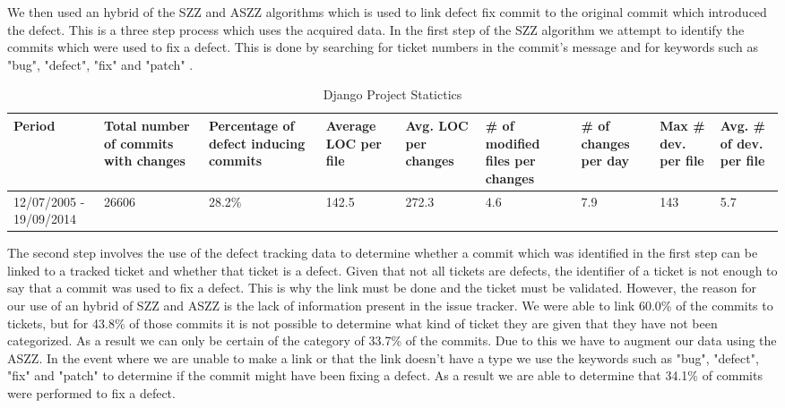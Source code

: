 \documentclass[10pt, conference]{IEEEtran}
\begin{document}
We then used an hybrid of the SZZ and ASZZ algorithms\cite{Sliwerski2005MSR} which is used to link defect fix commit to the original commit which introduced the defect. This is a three step process which uses the acquired data. In the first step of the SZZ algorithm we attempt to identify the commits which were used to fix a defect. This is done by searching for ticket numbers in the commit's message and for keywords such as "bug", "defect", "fix" and "patch" \cite{Kamei2013TSE}. 

\begin{table*}[t]
	\caption{Django Project Statictics}
	\begin{tabular}{|p{2 cm}|p{1.5 cm}|p{1.5 cm}|p{1.5 cm}|p{1.5 cm}|p{1.5 cm}|p{1.5 cm}|p{1.5 cm}|p{1.5 cm}|}
		\hline 
		Period  & Total number of commits with changes  & Percentage of defect inducing commits  & Average LOC per file  & Avg. LOC per changes  & \# of modified files per changes  & \# of changes per day  & Max \# dev. per file  & Avg. \# of dev. per file \tabularnewline
		\hline 
		12/07/2005 - 19/09/2014  & 26606  & 28.2\% & 142.5 & 272.3 & 4.6 & 7.9 & 143 & 5.7 \\ \hline 
	\end{tabular}
	\label{table:statistics}	
\end{table*}

The second step involves the use of the defect tracking data to determine whether a commit which was identified in the first step can be linked to a tracked ticket and whether that ticket is a defect. Given that not all tickets are defects, the identifier of a ticket is not enough to say that a commit was used to fix a defect. This is why the link must be done and the ticket must be validated. However, the reason for our use of an hybrid of SZZ and ASZZ is the lack of information present in the issue tracker. We were able to link 60.0\% of the commits to tickets, but for 43.8\% of those commits it is not possible to determine what kind of ticket they are given that they have not been categorized. As a result we can only be certain of the category of 33.7\% of the commits. Due to this we have to augment our data using the ASZZ. In the event where we are unable to make a link or that the link doesn't have a type we use the keywords such as "bug", "defect", "fix" and "patch" \cite{Kamei2013TSE} to determine if the commit might have been fixing a defect. As a result we are able to determine that 34.1\% of commits were performed to fix a defect. 
\end{document}
